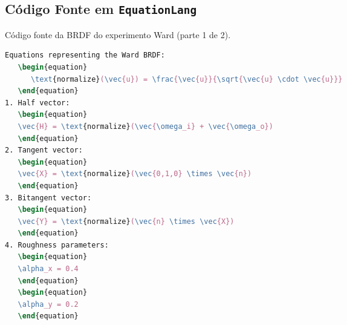 \subsection{Código Fonte em \texttt{EquationLang}}
\begin{codigo}[H]
    \caption{\small Código fonte da BRDF do experimento Ward (parte 1 de 2).}
    \label{cod-ward-eqlang-pt-1}
\begin{lstlisting}[language=tex, frame=none, inputencoding=utf8]
Equations representing the Ward BRDF:
   \begin{equation}
      \text{normalize}(\vec{u}) = \frac{\vec{u}}{\sqrt{\vec{u} \cdot \vec{u}}}
   \end{equation}
1. Half vector:
   \begin{equation}
   \vec{H} = \text{normalize}(\vec{\omega_i} + \vec{\omega_o})
   \end{equation}
2. Tangent vector:
   \begin{equation}
   \vec{X} = \text{normalize}(\vec{0,1,0} \times \vec{n})
   \end{equation}
3. Bitangent vector:
   \begin{equation}
   \vec{Y} = \text{normalize}(\vec{n} \times \vec{X})
   \end{equation}
4. Roughness parameters:
   \begin{equation}
   \alpha_x = 0.4
   \end{equation}
   \begin{equation}
   \alpha_y = 0.2
   \end{equation}
\end{lstlisting}
\end{codigo}

